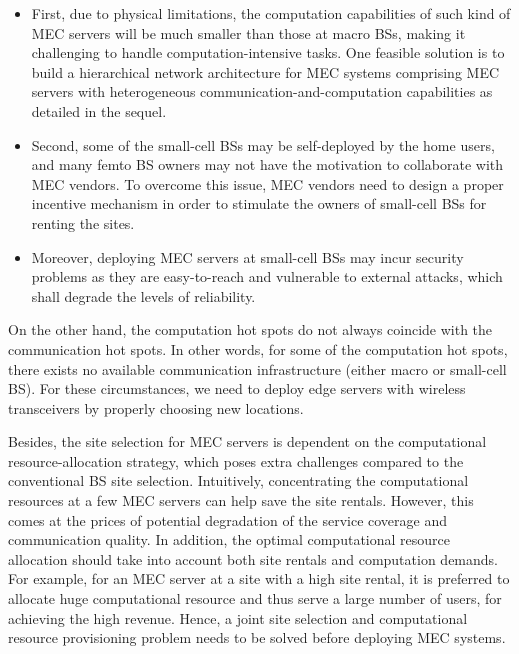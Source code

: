 \documentclass[journal]{IEEEtran}
\begin{document}
{\begin{itemize}
\item First, due to physical limitations, the computation capabilities of such kind of MEC servers will be much smaller than those at  macro BSs, making it challenging  to handle  computation-intensive tasks. One feasible solution is to build a hierarchical network architecture for MEC systems comprising MEC servers with heterogeneous communication-and-computation capabilities as detailed in the sequel.

\item Second, some of the small-cell BSs may be self-deployed by the home users, and many femto BS owners may not have the motivation to collaborate with MEC vendors. To overcome this issue, MEC vendors need to design a proper incentive mechanism in order to stimulate the owners of small-cell BSs for renting the sites.

\item Moreover, deploying MEC servers at small-cell BSs may incur security problems as they are easy-to-reach and vulnerable to external attacks, which shall degrade the levels of reliability.
\end{itemize}

On the other hand, the computation hot spots do not always coincide with the communication hot spots. In other words, for some of the computation hot spots, there exists no available communication infrastructure (either macro or small-cell BS). For these circumstances, we need to deploy edge servers with wireless transceivers by properly choosing new locations.

Besides, the site selection for MEC servers is dependent on the computational resource-allocation strategy, which poses extra challenges compared to the conventional BS site selection. Intuitively, concentrating the computational resources at a few MEC servers can help save the site rentals. However, this comes at the prices of potential degradation of the service coverage and communication quality. In addition, the optimal computational resource allocation should take into account both site rentals and computation demands. For example,  for an MEC server at a site with a high site rental, it is preferred to allocate huge computational resource and thus serve a large number of users, for achieving the high revenue.  Hence, a joint site selection and computational resource provisioning problem needs to be solved before deploying MEC systems.

}
\end{document}
